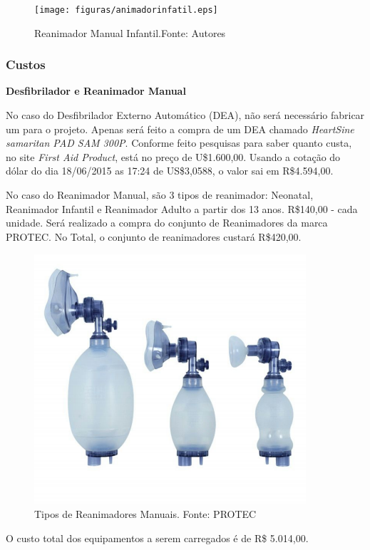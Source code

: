 \begin{figure}[H]
	\centering
	  \texttt{[image: figuras/animadorinfatil.eps]}
	\caption{ Reanimador Manual Infantil.Fonte: Autores}
	\label{fig:animadorinfatil}
\end{figure}

\subsubsection{Custos}

\indent \textbf{Desfibrilador e Reanimador Manual}

No caso do Desfibrilador Externo Automático (DEA), não será necessário fabricar um
para o projeto. Apenas será feito a compra de um DEA chamado \textit{HeartSine samaritan PAD
SAM 300P}. Conforme feito pesquisas para saber quanto custa, no site \textit{First Aid Product}\footnotemark, está
no preço de U\$1.600,00. Usando a cotação do dólar do dia 18/06/2015 as 17:24 de
US\$3,0588, o valor sai em R\$4.594,00.

No caso do Reanimador Manual, são 3 tipos de reanimador: Neonatal, Reanimador Infantil e Reanimador Adulto a partir dos 13 anos. R\$140,00 - cada unidade\footnotemark. 
Será realizado a compra do conjunto de Reanimadores da marca PROTEC\footnotemark. No Total, o conjunto de reanimadores custará R\$420,00.

\begin{figure}[H]
    \centering
      \includegraphics[keepaspectratio=true,scale=0.4]{figuras/reanimadores.png}
    \caption{Tipos de Reanimadores Manuais. Fonte: PROTEC}
\end{figure}


O custo total dos equipamentos a serem carregados é de R\$ 5.014,00.